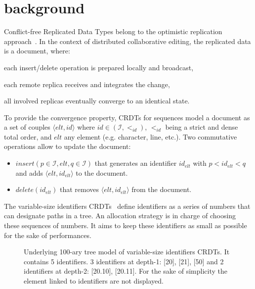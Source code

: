
\section{background}
\label{sec:background}

Conflict-free Replicated Data Types belong to the optimistic
replication approach~\cite{saito2002replication,saito2005optimistic}. In the
context of distributed collaborative editing, the replicated data is a
document, where:
\begin{inparaenum}[(1)]
\item each insert/delete operation is prepared locally and broadcast,
\item each remote replica receives and integrates the change,
\item all involved replicas eventually converge to an identical state.
\end{inparaenum}

To provide the convergence property, CRDTs for sequences model a document as a
set of couples $\langle elt, id\rangle$ where $id \in (\mathcal{I}, <_{id})$,
$<_{id}$ being a strict and dense total order, and $elt$ any element
(e.g. character, line, etc.). Two commutative operations allow to update the
document:
\begin{itemize}
\item $insert(p \in \mathcal{I}, elt, q \in \mathcal{I})$ that generates an
  identifier $id_{elt}$ with $p<id_{elt}<q$ and adds $\langle elt, id_{elt}
  \rangle$ to the document.
\item $delete(id_{elt})$ that removes $\langle elt, id_{elt}\rangle$ from the
  document.
\end{itemize} 

The variable-size identifiers
CRDTs~\cite{preguica2009commutative,weiss2009logoot} define identifiers as a
series of numbers that can designate paths in a tree. An allocation strategy is
in charge of choosing these sequences of numbers. It aims to keep these
identifiers as small as possible for the sake of performances.

\begin{figure}[h]
\begin{center}

\end{center}
\caption{Underlying 100-ary tree model of variable-size identifiers CRDTs. It
  contains 5 identifiers. 3 identifiers at depth-1: [20], [21], [50] and 2
  identifiers at depth-2: [20.10], [20.11]. For the sake of simplicity the
  element linked to identifiers are not displayed.}
\label{fig:treeexample}
\end{figure}

